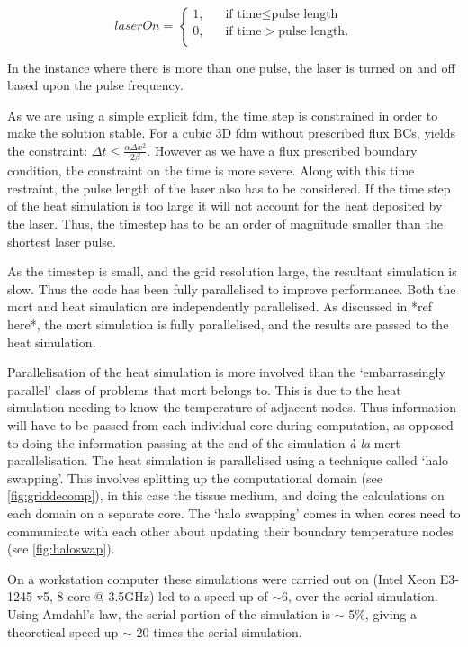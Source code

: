 \[   
laserOn = 
     \begin{cases}
       \text{1,} &\quad\text{if time}\le\text{pulse length}\\
       \text{0,} &\quad\text{if time}>\text{pulse length}.\\
     \end{cases}
\]

In the instance where there is more than one pulse, the laser is turned on and off based upon the pulse frequency.

\medskip

As we are using a simple explicit \gls{fdm}, the time step is constrained in order to make the solution stable. For a cubic 3D \gls{fdm} without prescribed flux BCs, yields the constraint: $\Delta t \leq \tfrac{\alpha \Delta x^2}{2\beta}$. However as we have a flux prescribed boundary condition, the constraint on the time is more severe. Along with this time restraint, the pulse length of the laser also has to be considered. If the time step of the heat simulation is too large it will not account for the heat deposited by the laser. Thus, the timestep has to be an order of magnitude smaller than the shortest laser pulse.

As the timestep is small, and the grid resolution large, the resultant simulation is slow. Thus the code has been fully parallelised to improve performance. Both the \gls{mcrt} and heat simulation are independently parallelised. As discussed in *ref here*, the \gls{mcrt} simulation is fully parallelised, and the results are passed to the heat simulation.

\medskip

Parallelisation of the heat simulation is more involved than the `embarrassingly parallel' class of problems that \gls{mcrt} belongs to. This is due to the heat simulation needing to know the temperature of adjacent nodes. Thus information will have to be passed from each individual core during computation, as opposed to doing the information passing at the end of the simulation \textit{\`a la} \gls{mcrt} parallelisation.
The heat simulation is parallelised using a technique called `halo swapping'. This involves splitting up the computational domain (see \cref{fig:griddecomp}), in this case the tissue medium, and doing the calculations on each domain on a separate core. The `halo swapping' comes in when cores need to communicate with each other about updating their boundary temperature nodes (see \cref{fig:haloswap}).

On a workstation computer these simulations were carried out on (Intel Xeon E3-1245 v5, 8 core @ 3.5GHz) led to a speed up of $\sim$6, over the serial simulation. Using Amdahl's law\cite{amdahl1967validity}, the serial portion of the simulation is $\sim$ 5\%, giving a theoretical speed up $\sim$ 20 times the serial simulation.


